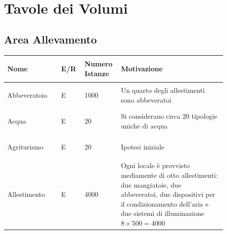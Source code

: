 \documentclass[12pt,a4paper]{article}
\begin{document}
\newpage


\section{Tavole dei Volumi}
\label{sec:volumi}


\subsection{Area Allevamento}
\begin{center}
\setlength{\extrarowheight}{1.5pt}
\begin{longtable}{|p{0.23\linewidth}|p{0.1\linewidth}|p{0.11\linewidth}|p{0.45\linewidth}|}
\hline \textbf{Nome} 	& \begin{center}\vspace{-15pt}\textbf{E/R}\end{center} & \textbf{Numero Istanze} & \textbf{Motivazione}\\ 

    
\hline
Abbeveratoio			& \begin{center}
\vspace{-25pt}E
\end{center}
					& \begin{center}
					\vspace{-25pt}1000\end{center}
					& Un quarto degli allestimenti sono abbeveratoi \\
\hline
Acqua 				& \begin{center}
\vspace{-25pt}E
\end{center}
					& \begin{center}
					\vspace{-25pt}20\end{center}
					&  Si considerano circa 20 tipologie uniche di acqua \\ 

\hline
Agriturismo 				& \begin{center}
\vspace{-25pt}E
\end{center}
					& \begin{center}
					\vspace{-25pt}20
					\end{center}
					&  Ipotesi iniziale \\ 

\hline
Allestimento 				& \begin{center}
\vspace{-25pt}E
\end{center}
					& \begin{center}
					\vspace{-25pt}4000\end{center}
					&  Ogni locale è provvisto mediamente di otto allestimenti: due mangiatoie, due abbeveratoi, due dispositivi per il condizionamento dell'aria e due sistemi di illuminazione $8\times 500 = 4000$\\ 


\end{longtable}
\end{center}
\end{document}
